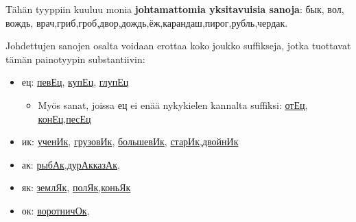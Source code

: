 \documentclass[]{scrartcl}
\providecommand{\tightlist}{%
  \setlength{\itemsep}{0pt}\setlength{\parskip}{0pt}}
\begin{document}
Tähän tyyppiin kuuluu monia \textbf{johtamattomia yksitavuisia sanoja}:
бык, вол, вождь,
врач,гриб,гроб,двор,дождь,ёж,карандаш,пирог,рубль,чердак.

Johdettujen sanojen osalta voidaan erottaa koko joukko suffikseja, jotka
tuottavat tämän painotyypin substantiivin:

\begin{itemize}
\tightlist
\item
  ец:
  \href{http://ru.wiktionary.org/wiki/\%D0\%BF\%D0\%B5\%D0\%B2\%D0\%B5\%D1\%86}{певЕц},
  \href{http://ru.wiktionary.org/wiki/\%D0\%BA\%D1\%83\%D0\%BF\%D0\%B5\%D1\%86}{купЕц},
  \href{http://ru.wiktionary.org/wiki/\%D0\%B3\%D0\%BB\%D1\%83\%D0\%BF\%D0\%B5\%D1\%86}{глупЕц}

  \begin{itemize}
  \tightlist
  \item
    Myös sanat, joissa ец ei enää nykykielen kannalta suffiksi:
    \href{http://ru.wiktionary.org/wiki/\%D0\%BE\%D1\%82\%D0\%B5\%D1\%86}{отЕц},
    \href{http://ru.wiktionary.org/wiki/\%D0\%BA\%D0\%BE\%D0\%BD\%D0\%B5\%D1\%86}{конЕц},\href{http://ru.wiktionary.org/wiki/\%D0\%BF\%D0\%B5\%D1\%81\%D0\%B5\%D1\%86}{песЕц}
  \end{itemize}
\item
  ик:
  \href{http://ru.wiktionary.org/wiki/\%D1\%83\%D1\%87\%D0\%B5\%D0\%BD\%D0\%B8\%D0\%BA}{ученИк},
  \href{http://ru.wiktionary.org/wiki/\%D0\%B3\%D1\%80\%D1\%83\%D0\%B7\%D0\%BE\%D0\%B2\%D0\%B8\%D0\%BA}{грузовИк},
  \href{http://ru.wiktionary.org/wiki/\%D0\%B1\%D0\%BE\%D0\%BB\%D1\%8C\%D1\%88\%D0\%B5\%D0\%B2\%D0\%B8\%D0\%BA}{большевИк},
  \href{http://ru.wiktionary.org/wiki/\%D1\%81\%D1\%82\%D0\%B0\%D1\%80\%D0\%B8\%D0\%BA}{старИк},\href{http://ru.wiktionary.org/wiki/\%D0\%B4\%D0\%B2\%D0\%BE\%D0\%B9\%D0\%BD\%D0\%B8\%D0\%BA}{двойнИк}
\item
  ак:
  \href{http://ru.wiktionary.org/wiki/\%D1\%80\%D1\%8B\%D0\%B1\%D0\%B0\%D0\%BA}{рыбАк},\href{http://ru.wiktionary.org/wiki/\%D0\%B4\%D1\%83\%D1\%80\%D0\%B0\%D0\%BA}{дурАк}\href{http://ru.wiktionary.org/wiki/\%D0\%BA\%D0\%B0\%D0\%B7\%D0\%B0\%D0\%BA}{казАк},
\item
  як:
  \href{http://ru.wiktionary.org/wiki/\%D0\%B7\%D0\%B5\%D0\%BC\%D0\%BB\%D1\%8F\%D0\%BA}{землЯк},
  \href{http://ru.wiktionary.org/wiki/\%D0\%BF\%D0\%BE\%D0\%BB\%D1\%8F\%D0\%BA}{полЯк},\href{http://ru.wiktionary.org/wiki/\%D0\%BA\%D0\%BE\%D0\%BD\%D1\%8C\%D1\%8F\%D0\%BA}{коньЯк}
\item
  ок:
  \href{http://ru.wiktionary.org/wiki/\%D0\%B2\%D0\%BE\%D1\%80\%D0\%BE\%D1\%82\%D0\%BD\%D0\%B8\%D1\%87\%D0\%BE\%D0\%BA}{воротничОк},

\end{itemize}
\end{document}
